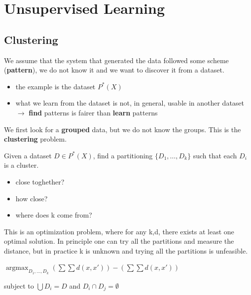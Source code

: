 
\chapter{Unsupervised Learning}


\section{Clustering}

We assume that the system that generated the data followed some scheme (\textbf{pattern}), we do not know it and we want to discover it from a dataset.

\begin{itemize}
    \item the example is the dataset $P^{*}(X)$
    \item what we learn from the dataset is not, in general, usable in another dataset $\to$ \textbf{find} patterns is fairer than \textbf{learn} patterns
\end{itemize}

We first look for a \textbf{grouped} data, but we do not know the groups. This is the \textbf{clustering} problem.


Given a dataset $D \in P^*(X)$, find a partitioning $\{D_1,\dots,D_k\}$ such that each $D_i$ is a cluster.

\begin{itemize}
    \item close toghether?
    \item how close?
    \item where does k come from?
\end{itemize}

This is an optimization problem, where for any k,d, there exists at least one optimal solution. In principle one can try all the partitions and measure the distance, but in practice k is unknown and trying all the partitions is unfeasible.

\begin{center}
    $\operatorname*{argmax}_{D_1,\dots,D_k}(\sum \sum d(x,x'))-(\sum\sum d(x,x'))$

    subject to $\bigcup D_i = D$ and $D_i \cap D_j = \emptyset$
\end{center}

